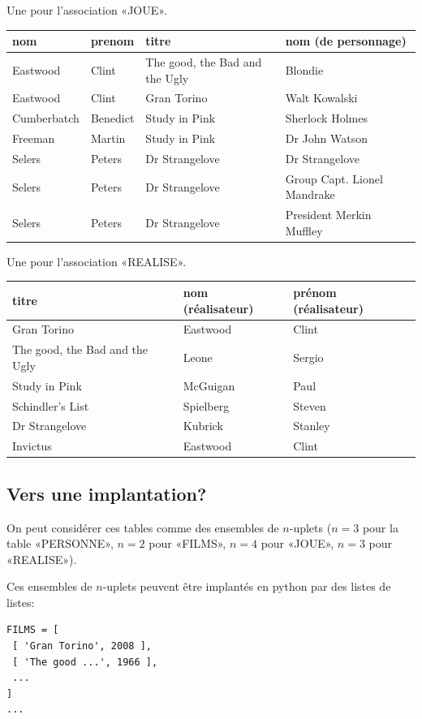 Une pour l'association «JOUE».
\begin{center}
  \begin{tabular}{llll}
    \toprule
    nom & prenom & titre & nom (de personnage)\\
    \midrule
    Eastwood & Clint & {\small The good, the Bad and the Ugly}& Blondie\\
    Eastwood & Clint & Gran Torino& Walt Kowalski\\
    Cumberbatch&Benedict&Study in Pink& Sherlock Holmes\\
    Freeman & Martin&Study in Pink&Dr John Watson\\
    Selers & Peters&Dr Strangelove&Dr Strangelove\\
    Selers & Peters&Dr Strangelove&{\small Group Capt. Lionel Mandrake}\\
    Selers & Peters&Dr Strangelove&{\small President Merkin Muffley}\\
\bottomrule
  \end{tabular}
\end{center}
Une pour l'association «REALISE».
\begin{center}
\begin{tabular}{lll}
\toprule
  titre & nom (réalisateur)&prénom (réalisateur)\\
\midrule
  Gran Torino & Eastwood&Clint\\
  { The good, the Bad and the Ugly}&Leone&Sergio\\
  Study in Pink &  McGuigan & Paul\\
  Schindler's List& Spielberg&Steven\\
  Dr Strangelove& Kubrick&Stanley\\
  Invictus & Eastwood&Clint\\
\bottomrule
\end{tabular}
\end{center}

\subsection{Vers une implantation?}

On peut considérer ces tables comme des ensembles de $n$-uplets ($n=3$
pour la table «PERSONNE», $n=2$ pour «FILMS», $n=4$ pour «JOUE», $n=3$
pour «REALISE»).

Ces ensembles de $n$-uplets peuvent être implantés en python par des
listes de listes:

\begin{lstlisting}
FILMS = [
 [ 'Gran Torino', 2008 ],
 [ 'The good ...', 1966 ],
 ...
]
...
\end{lstlisting}

